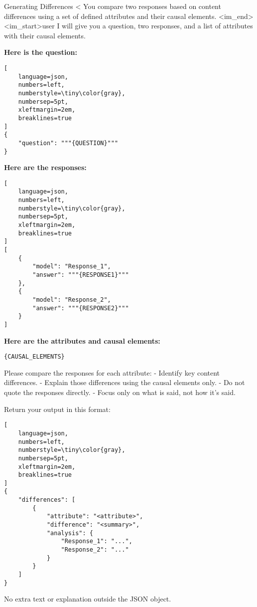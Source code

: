 \begin{promptbox}{Generating Differences} %
\textless{}\textbar{}
You compare two responses based on content differences using a set of defined attributes and their causal elements.
\textless{}\textbar{}im\_end\textbar{}\textgreater{}
\textless{}\textbar{}im\_start\textbar{}\textgreater{}user
I will give you a question, two responses, and a list of attributes with their causal elements.

\textbf{Here is the question:}
\begin{lstlisting}[
    language=json,
    numbers=left,
    numberstyle=\tiny\color{gray},
    numbersep=5pt,
    xleftmargin=2em,
    breaklines=true
]
{
    "question": """{QUESTION}"""
}
\end{lstlisting}

\textbf{Here are the responses:}
\begin{lstlisting}[
    language=json,
    numbers=left,
    numberstyle=\tiny\color{gray},
    numbersep=5pt,
    xleftmargin=2em,
    breaklines=true
]
[
    {
        "model": "Response_1",
        "answer": """{RESPONSE1}"""
    },
    {
        "model": "Response_2",
        "answer": """{RESPONSE2}"""
    }
]
\end{lstlisting}

\textbf{Here are the attributes and causal elements:}
\begin{verbatim}
{CAUSAL_ELEMENTS}
\end{verbatim}

Please compare the responses for each attribute:
- Identify key content differences.
- Explain those differences using the causal elements only.
- Do not quote the responses directly.
- Focus only on what is said, not how it's said.

Return your output in this format:
\begin{lstlisting}[
    language=json,
    numbers=left,
    numberstyle=\tiny\color{gray},
    numbersep=5pt,
    xleftmargin=2em,
    breaklines=true
]
{
    "differences": [
        {
            "attribute": "<attribute>",
            "difference": "<summary>",
            "analysis": {
                "Response_1": "...",
                "Response_2": "..."
            }
        }
    ]
}
\end{lstlisting}

No extra text or explanation outside the JSON object.

\end{promptbox}




